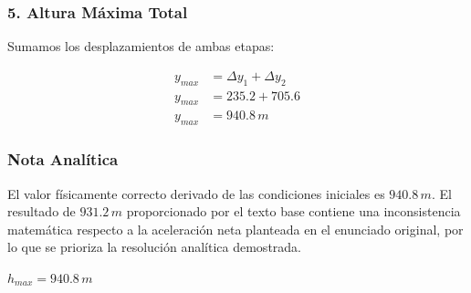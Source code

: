 \documentclass[12pt, a4paper]{article}
\begin{document}
\subsubsection*{5. Altura Máxima Total}
Sumamos los desplazamientos de ambas etapas:

\begin{align*}
y_{max} &= \Delta y_1 + \Delta y_2 \\
y_{max} &= 235.2 + 705.6 \\
y_{max} &= 940.8 \, \si{m}
\end{align*}

\subsubsection*{Nota Analítica}
El valor físicamente correcto derivado de las condiciones iniciales es $940.8 \, \si{m}$. El resultado de $931.2 \, \si{m}$ proporcionado por el texto base contiene una inconsistencia matemática respecto a la aceleración neta planteada en el enunciado original, por lo que se prioriza la resolución analítica demostrada.

\begin{tcolorbox}[colback=green!5!white, colframe=green!50!black, title=Respuesta Final]
\centering \Large $h_{max} = 940.8 \, \si{m}$
\end{tcolorbox}
\end{document}
